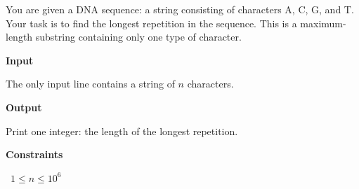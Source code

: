 You are given a DNA sequence: a string consisting of characters A, C, G, and T. Your task is to find the longest repetition in the sequence. This is a maximum-length substring containing only one type of character.

\vspace{0.3cm}\noindent\textbf{Input}

The only input line contains a string of $n$ characters.

\vspace{0.3cm}\noindent\textbf{Output}

Print one integer: the length of the longest repetition.

\vspace{0.3cm}\noindent\textbf{Constraints}

\textbullet\ $1 \le n \le 10^6$